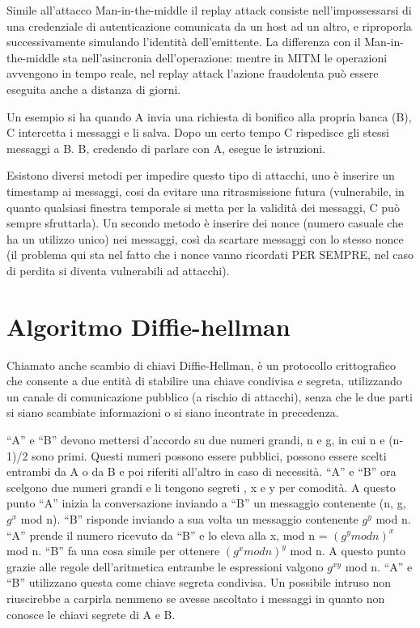 Simile all’attacco Man-in-the-middle il replay attack consiste nell'impossessarsi di una credenziale di autenticazione comunicata da un host ad un altro, e riproporla successivamente simulando l'identità dell'emittente. La differenza con il Man-in-the-middle sta nell’asincronia dell’operazione: mentre in MITM le operazioni avvengono in tempo reale, nel replay attack l’azione fraudolenta può essere eseguita anche a distanza di giorni.

Un esempio si ha quando A invia una richiesta di bonifico alla propria banca (B), C intercetta i messaggi e li salva. Dopo un certo tempo C rispedisce gli stessi messaggi a B. B, credendo di parlare con A, esegue le istruzioni. 

Esistono diversi metodi per impedire questo tipo di attacchi, uno è inserire un timestamp ai messaggi, cosi da evitare una ritrasmissione futura (vulnerabile, in quanto qualsiasi finestra temporale si metta per la validità dei messaggi, C può sempre sfruttarla).
Un secondo metodo è inserire dei nonce (numero casuale che ha un utilizzo unico) nei messaggi, così da scartare messaggi con lo stesso nonce (il problema qui sta nel fatto che i nonce vanno ricordati PER SEMPRE, nel caso di perdita si diventa vulnerabili ad attacchi).

\section{Algoritmo Diffie-hellman}

Chiamato anche scambio di chiavi Diffie-Hellman, è un protocollo crittografico che consente a due entità di stabilire una chiave condivisa e segreta, utilizzando un canale di comunicazione pubblico (a rischio di attacchi), senza che le due parti si siano scambiate informazioni o si siano incontrate in precedenza.

“A” e “B” devono mettersi d’accordo su due numeri grandi, n e g, in cui n e (n-1)/2 sono primi.
Questi numeri possono essere pubblici, possono essere scelti entrambi da A o da B e poi riferiti all’altro in caso di necessità.
“A” e “B” ora scelgono due numeri grandi e li tengono segreti , x e y per comodità.
A questo punto “A” inizia la conversazione inviando a “B” un messaggio contenente (n, g, $g^x$ mod n).
“B” risponde inviando a sua volta un messaggio contenente $g^y$ mod n. 
“A” prende il numero ricevuto da “B” e lo eleva alla x, mod n = $(g^y mod n)^x$ mod n. “B” fa una cosa simile per ottenere $(g^x mod n)^y$ mod n.
A questo punto grazie alle regole dell’aritmetica entrambe le espressioni valgono $g^{xy}$ mod n. “A” e “B” utilizzano questa come chiave segreta condivisa.
Un possibile intruso non riuscirebbe a carpirla nemmeno se avesse ascoltato i messaggi in quanto non conosce le chiavi segrete di A e B.

